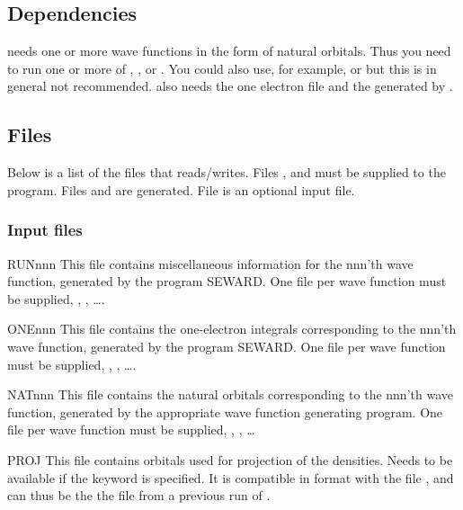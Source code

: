 \subsection{Dependencies}
\label{UG:sec:genano_dependencies}

 needs one or more wave functions in the
form of natural orbitals. Thus you need to run one or
more of
,
,
 or
.
You could also use, for example,  or 
but this is in general not recommended.
 also needs the one electron file
 and the  generated by .

\subsection{Files}
\label{UG:sec:genano_files}

Below is a list of the files that 
reads/writes.
Files ,  and  must be supplied to
the program.
Files  and  are generated.
File  is an optional input file.

\subsubsection{Input files}

\begin{filelist}
\item[RUNnnn]
This file contains miscellaneous information for the nnn'th
wave function,
generated by the program {\prgmfont SEWARD}.
One file per wave function must be supplied,
, , \ldots.
\item[ONEnnn]
This file contains the one-electron integrals corresponding to
the nnn'th wave function, generated by the program {\prgmfont SEWARD}.
One file per wave function must be supplied,
, , \ldots.
\item[NATnnn]
This file contains the natural orbitals corresponding to the
nnn'th wave function, generated by the appropriate wave function
generating program.
One file per wave function must be supplied,
, , \ldots
\item[PROJ]
This file contains orbitals used for projection of the densities.
Needs to be available if the keyword 
is specified.
It is compatible in format with the file , and can thus be the
the file  from a previous run of .
\end{filelist}

